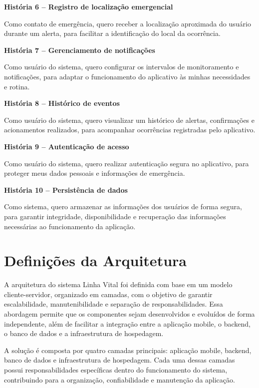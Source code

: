 \textbf{História 6 – Registro de localização emergencial}

Como contato de emergência, quero receber a localização aproximada do usuário durante um alerta, para facilitar a identificação do local da ocorrência.

\bigskip

\textbf{História 7 – Gerenciamento de notificações}

Como usuário do sistema, quero configurar os intervalos de monitoramento e notificações, para adaptar o funcionamento do aplicativo às minhas necessidades e rotina.

\bigskip

\textbf{História 8 – Histórico de eventos}

Como usuário do sistema, quero visualizar um histórico de alertas, confirmações e acionamentos realizados, para acompanhar ocorrências registradas pelo aplicativo.

\bigskip

\textbf{História 9 – Autenticação de acesso}

Como usuário do sistema, quero realizar autenticação segura no aplicativo, para proteger meus dados pessoais e informações de emergência.

\bigskip

\textbf{História 10 – Persistência de dados}

Como sistema, quero armazenar as informações dos usuários de forma segura, para garantir integridade, disponibilidade e recuperação das informações necessárias ao funcionamento da aplicação.


\section{Definições da Arquitetura}

A arquitetura do sistema Linha Vital foi definida com base em um modelo cliente-servidor, organizado em camadas, com o objetivo de garantir escalabilidade, manutenibilidade e separação de responsabilidades. Essa abordagem permite que os componentes sejam desenvolvidos e evoluídos de forma independente, além de facilitar a integração entre a aplicação mobile, o backend, o banco de dados e a infraestrutura de hospedagem.

A solução é composta por quatro camadas principais: aplicação mobile, backend, banco de dados e infraestrutura de hospedagem. Cada uma dessas camadas possui responsabilidades específicas dentro do funcionamento do sistema, contribuindo para a organização, confiabilidade e manutenção da aplicação.

